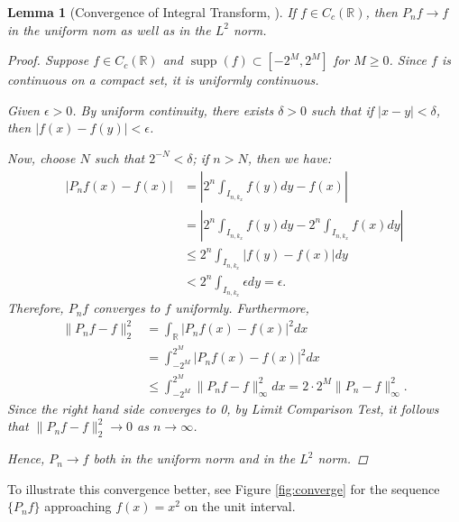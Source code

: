 \documentclass[11pt]{amsart}
\theoremstyle{theorem} %
\newtheorem{lem}[thm]{Lemma} %
\theoremstyle{definition}
\theoremstyle{example}
\theoremstyle{remark}
\numberwithin{equation}{section}
\newcommand{\R}{\mathbb{R}}
\DeclareMathOperator*{\supp}{supp}
\begin{document}
\begin{lem}[Convergence of Integral Transform, {\cite[517]{davidson}}] \label{lem:convergence}
	If $ f \in C_c(\R) $, then $ P_nf \to f $ in the uniform nom as well as in the $ L^2 $ norm.
	
	\begin{proof}
		Suppose $ f \in C_c(\R) $ and $ \supp(f) \subset [-2^M, 2^M] $ for $ M \geq 0 $. Since $ f $ is continuous on a compact set, it is uniformly continuous.
		
		Given $ \epsilon > 0 $. By uniform continuity, there exists $ \delta > 0 $ such that if $ |x-y| < \delta $, then $ |f(x) - f(y)| < \epsilon $.
		
		Now, choose $ N $ such that $ 2^{-N} < \delta $; if $ n > N $, then we have:
		\begin{align*}
		|P_nf(x) - f(x)| &= \left| 2^n \int_{I_{n,k_x}} f(y)dy - f(x) \right| \\
		&=  \left| 2^n \int_{I_{n,k_x}} f(y)dy - 2^n \int_{I_{n,k_x}} f(x) dy \right| \\
		&\leq 2^n \int_{I_{n,k_x}} |f(y) - f(x)| dy\\
		&< 2^n \int_{I_{n,k_x}} \epsilon dy = \epsilon.
		\end{align*}
		Therefore, $ P_nf $ converges to $ f $ uniformly. Furthermore,
		\begin{align*}
		\| P_nf - f \|_2^2 &= \int_{\R} |P_nf(x) - f(x)|^2dx \\
		&= \int_{-2^M}^{2^M} |P_nf(x) - f(x)|^2dx \\
		&\leq \int_{-2^M}^{2^M} \|P_nf - f\|_\infty^2dx = 2 \cdot 2^M \| P_n - f \|_\infty^2.
		\end{align*}
		Since the right hand side converges to 0, by Limit Comparison Test, it follows that $ \| P_nf-f \|_2^2 \to 0 $ as $ n \to \infty $.
		
		Hence, $ P_n \to f $ both in the uniform norm and in the $ L^2 $ norm.
	\end{proof}
\end{lem}

To illustrate this convergence better, see Figure \ref{fig:converge} for the sequence $ \{P_nf\} $ approaching $ f(x) = x^2 $ on the unit interval.
\end{document}
